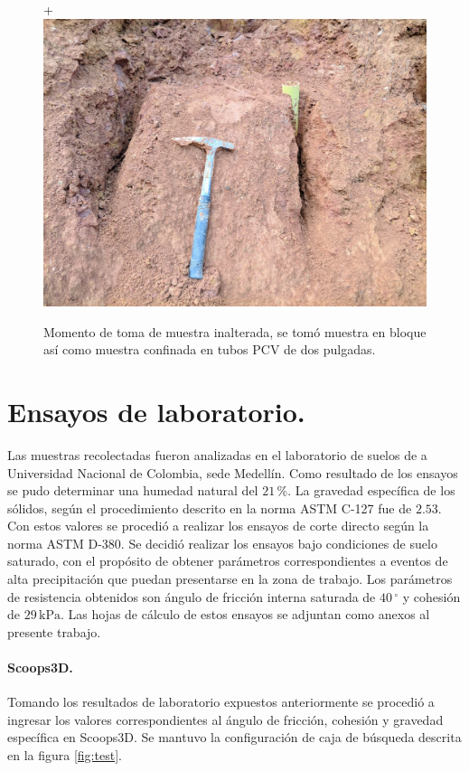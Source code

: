 \begin{figure}[H]+
\centering
\includegraphics[scale=0.20]{img/estacion11.jpg}
\caption{Momento de toma de muestra inalterada, se tom\'o muestra en bloque as\'i como muestra confinada en tubos PCV de dos pulgadas.}
\label{fig:toma-bloque}
\end{figure}

\section{Ensayos de laboratorio.}

Las muestras recolectadas fueron analizadas en el laboratorio de suelos de a Universidad Nacional de Colombia, sede Medell\'in.
Como resultado de los ensayos se pudo determinar una humedad natural del \(21\,\%\).
La gravedad espec\'ifica de los s\'olidos, seg\'un el procedimiento descrito en la norma ASTM C-127 fue de \(2.53\).
Con estos valores se procedi\'o a realizar los ensayos de corte directo seg\'un la norma ASTM D-380. Se decidi\'o realizar los ensayos bajo condiciones de suelo saturado, con el prop\'osito de obtener par\'ametros correspondientes a eventos de alta precipitaci\'on que puedan presentarse en la zona de trabajo.
Los par\'ametros de resistencia obtenidos son \'angulo de fricci\'on interna saturada de \(40\,^\circ\) y cohesi\'on de \(29\,\text{kPa}\). Las hojas de c\'alculo de estos ensayos se adjuntan como anexos al presente trabajo.

\paragraph{Scoops3D.}
Tomando los resultados de laboratorio expuestos anteriormente se procedi\'o a ingresar los valores correspondientes al \'angulo de fricci\'on, cohesi\'on y gravedad espec\'ifica en Scoops3D. Se mantuvo la configuraci\'on de caja de b\'usqueda descrita en la figura \ref{fig:test}.

